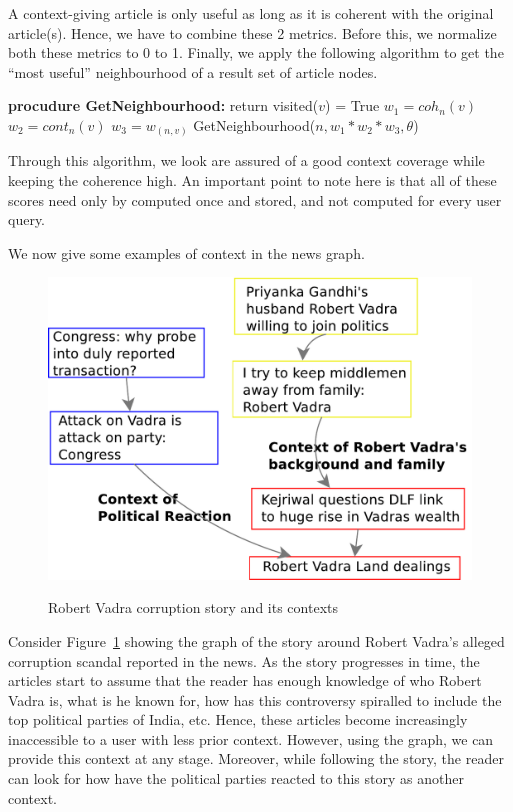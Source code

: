 A context-giving article is only useful as long as it is coherent with the original article(s).
Hence, we have to combine these 2 metrics. Before this, we normalize both these metrics to 0 to 1.
Finally, we apply the following algorithm to get the ``most useful'' neighbourhood of a result set of article nodes.

\begin{algorithmic}
  \State \textbf{procudure GetNeighbourhood:}
  \State {}
  \State {}
      \State return
    \EndIf
        \State visited($v$) = True
        \State $w_1 = coh_{n}(v)$
        \State $w_2 = cont_{n}(v)$
        \State $w_3 = w_{(n,v)}$
        \State GetNeighbourhood($n, w_1 * w_2 * w_3, \theta$)
      \EndIf
    \EndFor
\end{algorithmic}

Through this algorithm, we look are assured of a good context coverage while keeping the coherence high.
An important point to note here is that all of these scores need only by computed once and stored, and not computed for every user query. 

We now give some examples of context in the news graph.
\begin{figure}
\caption{Robert Vadra corruption story and its contexts}
\includegraphics[scale=0.36]{figures/graph-vadra.pdf}
\label{fig:vadra-corruption}
\end{figure}

Consider Figure~\ref{fig:vadra-corruption} showing the graph of the story around Robert Vadra's alleged
corruption scandal reported in the news. As the story progresses in time, the articles
start to assume that the reader has enough knowledge of who Robert Vadra is, what is he known for,
how has this controversy spiralled to include the top political parties of India, etc. Hence, these articles
become increasingly inaccessible to a user with less prior context. However, 
using the graph, we can provide this context at any stage. Moreover, while following the story, 
the reader can look for how have the political parties reacted to this story as another context.

